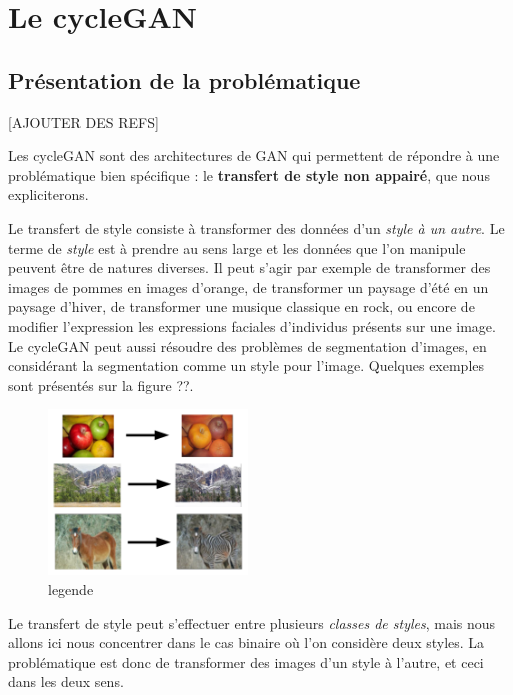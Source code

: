 \chapter{Le cycleGAN}

\section{Présentation de la problématique}

[AJOUTER DES REFS]

Les cycleGAN sont des architectures de GAN qui permettent de répondre à une problématique bien spécifique : le \textbf{transfert de style non appairé}, que nous expliciterons.

Le transfert de style consiste à transformer des données d'un \textit{style à un autre}. Le terme de \textit{style} est à prendre au sens large et les données que l'on manipule peuvent être de natures diverses. Il peut s'agir par exemple de transformer des images de pommes en images d'orange, de transformer un paysage d'été en un paysage d'hiver, de transformer une musique classique en rock, ou encore de modifier l'expression les expressions faciales d'individus présents sur une image. Le cycleGAN peut aussi résoudre des problèmes de segmentation d'images, en considérant la segmentation comme un style pour l'image. Quelques exemples sont présentés sur la figure ??.

\begin{figure}[!h]
\centering
\includegraphics[width=150pt,valign=t]{"images/cycle_exemples"}
\caption{legende}
\end{figure}


Le transfert de style peut s'effectuer entre plusieurs \textit{classes de styles}, mais nous allons ici nous concentrer dans le cas binaire où l'on considère deux styles. La problématique est donc de transformer des images d'un style à l'autre, et ceci dans les deux sens.

